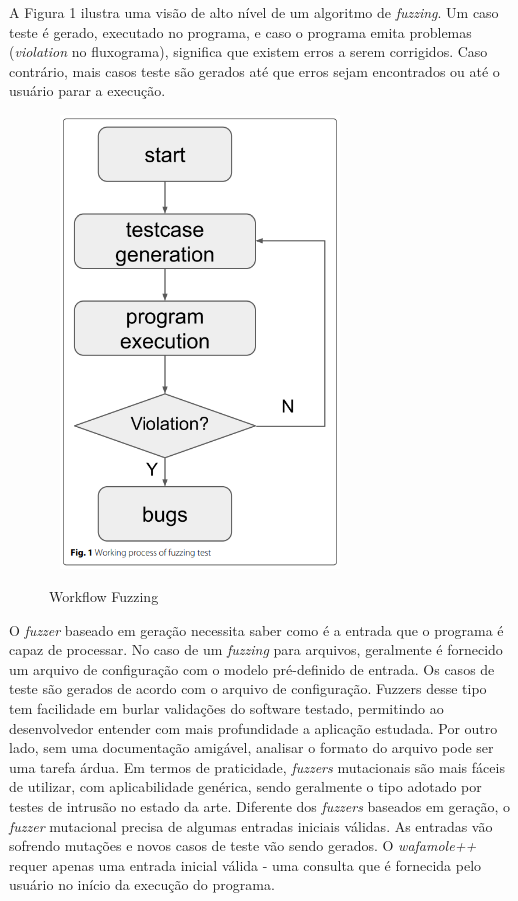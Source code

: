 A Figura 1 ilustra uma visão de alto nível de um algoritmo de \textit{fuzzing}. Um caso teste é gerado, executado no programa, e caso o programa emita problemas (\textit{violation} no fluxograma), significa que existem erros a serem corrigidos. Caso contrário, mais casos teste são gerados até que erros sejam encontrados ou até o usuário parar a execução.

\begin{figure}[ht]
    \centering
    \caption{Workflow Fuzzing}
    \includegraphics[width=8cm,height=12cm,keepaspectratio]{figuras/fuzzing imagem.png} 
    \label{fig:internet} 
\end{figure}

O \textit{fuzzer} baseado em geração necessita saber como é a entrada que o programa é capaz de processar. No caso de um \textit{fuzzing} para arquivos, geralmente é fornecido um arquivo de configuração com o modelo pré-definido de entrada. Os casos de teste são gerados de acordo com o arquivo de configuração. Fuzzers desse tipo tem facilidade em burlar validações do software testado, permitindo ao desenvolvedor entender com mais profundidade a aplicação estudada. Por outro lado, sem uma documentação amigável, analisar o formato do arquivo pode ser uma tarefa árdua.
Em termos de praticidade, \textit{fuzzers} mutacionais são mais fáceis de utilizar, com aplicabilidade genérica, sendo geralmente o tipo adotado por testes de intrusão no estado da arte. Diferente dos \textit{fuzzers} baseados em geração, o \textit{fuzzer} mutacional precisa de algumas entradas iniciais válidas. As entradas vão sofrendo mutações e novos casos de teste vão sendo gerados. O \textit{wafamole++} requer apenas uma entrada inicial válida - uma consulta que é fornecida pelo usuário no início da execução do programa.

